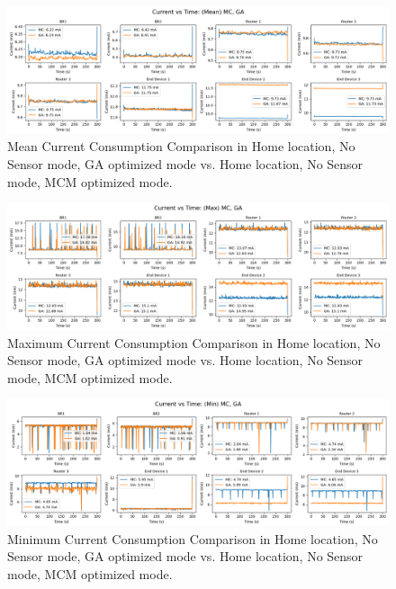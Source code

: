 \begin{figure}[H]
  \centering
  \includegraphics[width=1\textwidth]{images/research_results/current_consumption_analysis/optimized/home/no_sensor/ga/comparison/mean_comparison_home_no_sensor_ga_vs_home_no_sensor_mc.png}
    \caption{Mean Current Consumption Comparison in Home location, No Sensor mode, GA optimized mode vs. Home location, No Sensor mode, MCM optimized mode.}
    \label{fig:mean_comparison_home_no_sensor_ga_vs_home_no_sensor_mc}
\end{figure}

\begin{figure}[H]
  \centering
  \includegraphics[width=1\textwidth]{images/research_results/current_consumption_analysis/optimized/home/no_sensor/ga/comparison/max_comparison_home_no_sensor_ga_vs_home_no_sensor_mc.png}
    \caption{Maximum Current Consumption Comparison in Home location, No Sensor mode, GA optimized mode vs. Home location, No Sensor mode, MCM optimized mode.}
    \label{fig:max_comparison_home_no_sensor_ga_vs_home_no_sensor_mc}
\end{figure}

\begin{figure}[H]
  \centering
  \includegraphics[width=1\textwidth]{images/research_results/current_consumption_analysis/optimized/home/no_sensor/ga/comparison/min_comparison_home_no_sensor_ga_vs_home_no_sensor_mc.png}
    \caption{Minimum Current Consumption Comparison in Home location, No Sensor mode, GA optimized mode vs. Home location, No Sensor mode, MCM optimized mode.}
    \label{fig:min_comparison_home_no_sensor_ga_vs_home_no_sensor_mc}
\end{figure}

